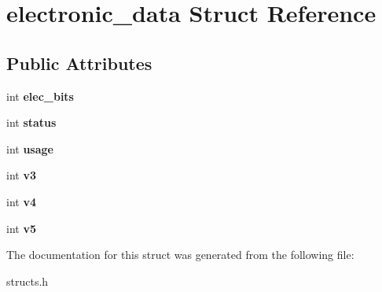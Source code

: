 \hypertarget{structelectronic__data}{\section{electronic\-\_\-data Struct Reference}
\label{structelectronic__data}
}
\subsection*{Public Attributes}
\begin{DoxyCompactItemize}
\item 
\hypertarget{structelectronic__data_a23855f2faf03e1ab06b6a8987eba1e5e}{int {\bfseries elec\-\_\-bits}}\label{structelectronic__data_a23855f2faf03e1ab06b6a8987eba1e5e}

\item 
\hypertarget{structelectronic__data_ae8da847532cdf8cbdbee95dc201709d2}{int {\bfseries status}}\label{structelectronic__data_ae8da847532cdf8cbdbee95dc201709d2}

\item 
\hypertarget{structelectronic__data_a6a551e8806536286f4f2de9a1c97f229}{int {\bfseries usage}}\label{structelectronic__data_a6a551e8806536286f4f2de9a1c97f229}

\item 
\hypertarget{structelectronic__data_aa244c4cfa7aa3ef1e8d9c19c04f1840e}{int {\bfseries v3}}\label{structelectronic__data_aa244c4cfa7aa3ef1e8d9c19c04f1840e}

\item 
\hypertarget{structelectronic__data_a55b8f9b927cd6ecafe1f2d4edc4975c3}{int {\bfseries v4}}\label{structelectronic__data_a55b8f9b927cd6ecafe1f2d4edc4975c3}

\item 
\hypertarget{structelectronic__data_a02993d0044d5ee7eaaf0d40a3531d60e}{int {\bfseries v5}}\label{structelectronic__data_a02993d0044d5ee7eaaf0d40a3531d60e}

\end{DoxyCompactItemize}


The documentation for this struct was generated from the following file\-:\begin{DoxyCompactItemize}
\item 
structs.\-h\end{DoxyCompactItemize}
